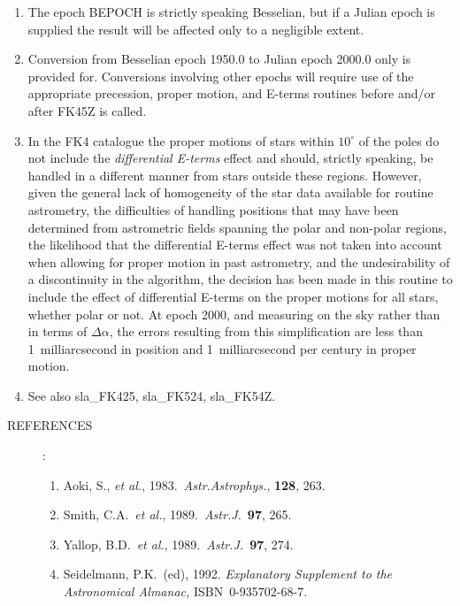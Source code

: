 \documentclass[11pt,twoside]{article}
\newlength{\oldspacing}
\newcommand{\refs}[1]
{
  \goodbreak
  \setlength{\oldspacing}{\topsep}
  \setlength{\topsep}{0.3ex}
  \begin{description}
    \item[REFERENCES]:
        #1
  \end{description}
  \setlength{\topsep}{\oldspacing}
}
\newcommand{\refs}[1]
   {
     \begin{description}
       \item[REFERENCES:]
           #1
     \end{description}
   }
\begin{document}
{
 \begin{enumerate}
  \item The epoch BEPOCH is strictly speaking Besselian, but
        if a Julian epoch is supplied the result will be
        affected only to a negligible extent.
  \item Conversion from Besselian epoch 1950.0 to Julian epoch
        2000.0 only is provided for.  Conversions involving other
        epochs will require use of the appropriate precession,
        proper motion, and E-terms routines before and/or
        after FK45Z is called.
  \item In the FK4 catalogue the proper motions of stars within
        $10^{\circ}$ of the poles do not include the {\it differential
        E-terms}\/ effect and should, strictly speaking, be handled
        in a different manner from stars outside these regions.
        However, given the general lack of homogeneity of the star
        data available for routine astrometry, the difficulties of
        handling positions that may have been determined from
        astrometric fields spanning the polar and non-polar regions,
        the likelihood that the differential E-terms effect was not
        taken into account when allowing for proper motion in past
        astrometry, and the undesirability of a discontinuity in
        the algorithm, the decision has been made in this routine to
        include the effect of differential E-terms on the proper
        motions for all stars, whether polar or not.  At epoch 2000,
        and measuring on the sky rather than in terms of $\Delta\alpha$,
        the errors resulting from this simplification are less than
        1~milliarcsecond in position and 1~milliarcsecond per
        century in proper motion.
  \item See also sla\_FK425, sla\_FK524, sla\_FK54Z.
 \end{enumerate}
}
\refs
{
 \begin{enumerate}
  \item Aoki, S., {\it et al.}, 1983.\ {\it Astr.Astrophys.}, {\bf 128}, 263.
  \item Smith, C.A.\ {\it et al.}, 1989.\  {\it Astr.J.}\ {\bf 97}, 265.
  \item Yallop, B.D.\ {\it et al.}, 1989.\ {\it Astr.J.}\ {\bf 97}, 274.
  \item Seidelmann, P.K.\ (ed), 1992.  {\it Explanatory
        Supplement to the Astronomical Almanac,}\/ ISBN~0-935702-68-7.
 \end{enumerate}
}
\end{document}
